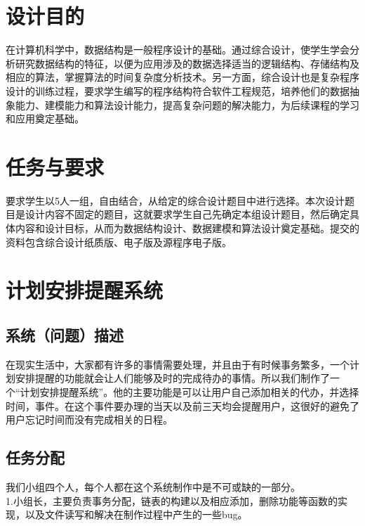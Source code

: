 \documentclass[UTF8]{article}
\begin{document}
\newpage
\restoregeometry
\newpage

\setcounter{page}{1}
\tableofcontents
\newpage
\setcounter{page}{1}


\xiaosi

\setcounter{page}{1}
\begin{center}
\bf {}
\end{center}

\section{设计目的}
在计算机科学中，数据结构是一般程序设计的基础。通过综合设计，使学生学会分析研究数据结构的特征，以便为应用涉及的数据选择适当的逻辑结构、存储结构及相应的算法，掌握算法的时间复杂度分析技术。另一方面，综合设计也是复杂程序设计的训练过程，要求学生编写的程序结构符合软件工程规范，培养他们的数据抽象能力、建模能力和算法设计能力，提高复杂问题的解决能力，为后续课程的学习和应用奠定基础。

\section{任务与要求}

要求学生以5人一组，自由结合，从给定的综合设计题目中进行选择。本次设计题目是设计内容不固定的题目，这就要求学生自己先确定本组设计题目，然后确定具体内容和设计目标，从而为数据结构设计、数据建模和算法设计奠定基础。提交的资料包含综合设计纸质版、电子版及源程序电子版。


\section{计划安排提醒系统}
\subsection{系统（问题）描述}
在现实生活中，大家都有许多的事情需要处理，并且由于有时候事务繁多，一个计划安排提醒的功能就会让人们能够及时的完成待办的事情。所以我们制作了一个“计划安排提醒系统”。他的主要功能是可以让用户自己添加相关的代办，并选择时间，事件。在这个事件要办理的当天以及前三天均会提醒用户，这很好的避免了用户忘记时间而没有完成相关的日程。
\subsection{任务分配}
我们小组四个人，每个人都在这个系统制作中是不可或缺的一部分。\\
1.小组长，主要负责事务分配，链表的构建以及相应添加，删除功能等函数的实现，以及文件读写和解决在制作过程中产生的一些bug。
\end{document}
